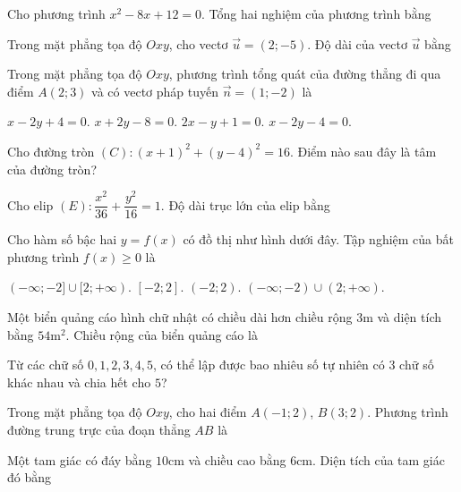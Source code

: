 
\NQuestion Cho phương trình $x^2-8x+12=0$. Tổng hai nghiệm của phương trình bằng


\NQuestion Trong mặt phẳng tọa độ $Oxy$, cho vectơ $\vec u=(2;-5)$. Độ dài của vectơ $\vec u$ bằng


\NQuestion Trong mặt phẳng tọa độ $Oxy$, phương trình tổng quát của đường thẳng đi qua điểm $A(2;3)$ và có vectơ pháp tuyến $\vec n=(1;-2)$ là

\ChoicesTwoLines
{$x-2y+4=0$.}
{$x+2y-8=0$.}
{$2x-y+1=0$.}
{$x-2y-4=0$.}

\NQuestion Cho đường tròn $(C):(x+1)^2+(y-4)^2=16$. Điểm nào sau đây là tâm của đường tròn?


\NQuestion Cho elip $(E):\dfrac{x^2}{36}+\dfrac{y^2}{16}=1$. Độ dài trục lớn của elip bằng


\NQuestion Cho hàm số bậc hai $y=f\left(x\right)$ có đồ thị như hình dưới đây. Tập nghiệm của bất phương trình $f\left(x\right)\ge 0$ là

\begin{center}

\end{center}

\ChoicesTwoLines
{$(-\infty;-2]\cup[2;+\infty)$.}
{$[-2;2]$.}
{$(-2;2)$.}
{$(-\infty;-2)\cup(2;+\infty)$.}

\NQuestion Một biển quảng cáo hình chữ nhật có chiều dài hơn chiều rộng $3$m và diện tích bằng $54$m$^2$. Chiều rộng của biển quảng cáo là


\NQuestion Từ các chữ số $0,1,2,3,4,5$, có thể lập được bao nhiêu số tự nhiên có $3$ chữ số khác nhau và chia hết cho $5$?


\NQuestion Trong mặt phẳng tọa độ $Oxy$, cho hai điểm $A(-1;2)$, $B(3;2)$. Phương trình đường trung trực của đoạn thẳng $AB$ là


\NQuestion Một tam giác có đáy bằng $10$cm và chiều cao bằng $6$cm. Diện tích của tam giác đó bằng


